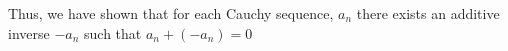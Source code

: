 \documentclass[preview]{standalone}
\begin{document}
\begin{center}
Thus, we have shown that for each Cauchy sequence, $a_n$ there exists an additive inverse $-a_n$ such that $a_n + (-a_n) = 0$
\end{center}
\end{document}
